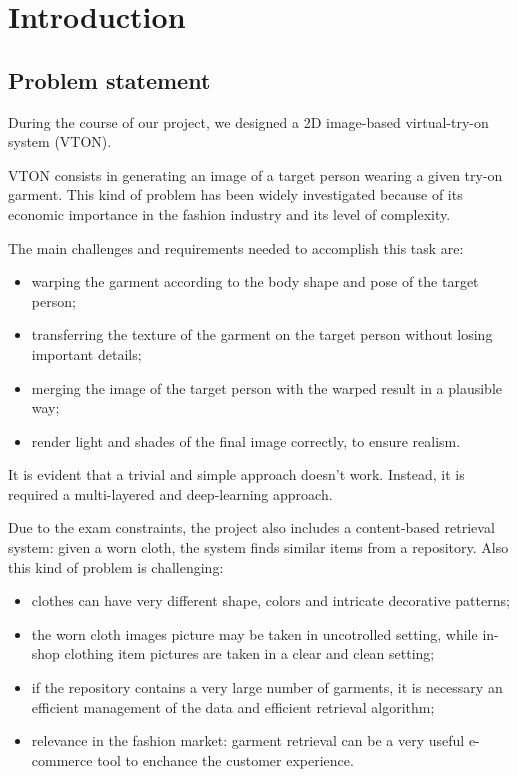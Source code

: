 \tableofcontents

\section{Introduction}


\subsection{Problem statement}
During the course of our project, we designed a 2D image-based virtual-try-on system (VTON).

VTON consists in generating an image of a target person wearing a given try-on garment. This kind of problem has been widely investigated because of its economic importance in the fashion industry and its level of complexity.

The main challenges and requirements \cite{CP-VTON} needed to accomplish this task are:
\begin{itemize}[noitemsep]
\item warping the garment according to the body shape and pose of the target person;
\item transferring the texture of the garment on the target person without losing important details; 
\item merging the image of the target person with the warped result in a plausible way; 
\item render light and shades of the final image correctly, to ensure realism.
\end{itemize}
It is evident that a trivial and simple approach doesn't work. Instead, it is required a multi-layered and deep-learning approach.

Due to the exam constraints, the project also includes a content-based retrieval system: given a worn cloth, the system finds similar items from a repository. Also this kind of problem is challenging: 
\begin{itemize}[noitemsep]
\item clothes can have very different shape, colors and intricate decorative patterns;
\item the worn cloth images picture may be taken in uncotrolled setting, while in-shop clothing item pictures are taken in a clear and clean setting;
\item if the repository contains a very large number of garments, it is necessary an efficient management of the data and efficient retrieval algorithm;
\item relevance in the fashion market: garment retrieval can be a very useful e-commerce tool to enchance the customer experience.
\end{itemize}

